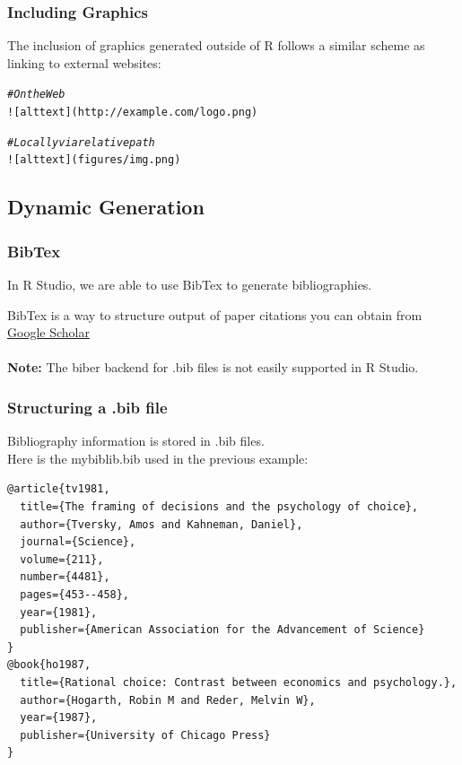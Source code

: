 \documentclass{beamer}\usepackage[]{graphicx}\usepackage[]{color}
\makeatletter
\newcommand{\hlcom}[1]{\textcolor[rgb]{0.678,0.584,0.686}{\textit{#1}}}%
\newenvironment{kframe}{%
 \def\at@end@of@kframe{}%
 \ifinner\ifhmode%
  \def\at@end@of@kframe{\end{minipage}}%
  \begin{minipage}{\columnwidth}%
 \fi\fi%
 \def\FrameCommand##1{\hskip\@totalleftmargin \hskip-\fboxsep
 \colorbox{shadecolor}{##1}\hskip-\fboxsep
     \hskip-\linewidth \hskip-\@totalleftmargin \hskip\columnwidth}%
 \MakeFramed {\advance\hsize-\width
   \@totalleftmargin\z@ \linewidth\hsize
   \@setminipage}}%
 {\par\unskip\endMakeFramed%
 \at@end@of@kframe}
\newenvironment{knitrout}{}{} %
\makeatother
\begin{document}
\begin{frame}[fragile]
\frametitle{Including Graphics}
The inclusion of graphics generated outside of R follows a similar scheme as linking to external websites:
\begin{knitrout}
\color{fgcolor}\begin{kframe}
\begin{alltt}
\hlcom{# On the Web}
![alt text](http://example.com/logo.png) 

\hlcom{# Locally via relative path}
![alt text](figures/img.png)             
\end{alltt}
\end{kframe}
\end{knitrout}
\end{frame}


\subsection{Dynamic Generation}
\begin{frame}[fragile]
\frametitle{BibTex}
In R Studio, we are able to use BibTex to generate bibliographies.

BibTex is a way to structure output of paper citations you can obtain from \href{https://scholar.google.com/}{Google Scholar}
\\$ $\\
\textbf{Note:} The biber backend for .bib files is not easily supported in R Studio.
\end{frame}

\begin{frame}[fragile]
\frametitle{Structuring a .bib file}
Bibliography information is stored in .bib files. \\
Here is the mybiblib.bib used in the previous example:
\footnotesize
\begin{verbatim}
@article{tv1981,
  title={The framing of decisions and the psychology of choice},
  author={Tversky, Amos and Kahneman, Daniel},
  journal={Science},
  volume={211},
  number={4481},
  pages={453--458},
  year={1981},
  publisher={American Association for the Advancement of Science}
}
@book{ho1987,
  title={Rational choice: Contrast between economics and psychology.},
  author={Hogarth, Robin M and Reder, Melvin W},
  year={1987},
  publisher={University of Chicago Press}
}
\end{verbatim}

\end{frame}
\end{document}
